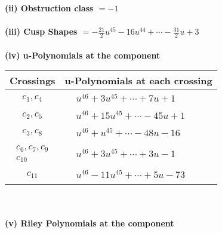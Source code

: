 \documentclass[1p]{elsarticle_modified}
\theoremstyle{definition}
\begin{document}
\flushleft \textbf{(ii) Obstruction class $= -1$}\\~\\
\flushleft \textbf{(iii) Cusp Shapes $= -\frac{21}{2} u^{45}-16 u^{44}+\cdots-\frac{31}{2} u+3$}\\~\\
\newpage\renewcommand{\arraystretch}{1}
\flushleft \textbf{(iv) u-Polynomials at the component}\newline \\
\begin{tabular}{m{50pt}|m{274pt}}
Crossings & \hspace{64pt}u-Polynomials at each crossing \\
\hline $$\begin{aligned}c_{1},c_{4}\end{aligned}$$&$\begin{aligned}
&u^{46}+3 u^{45}+\cdots+7 u+1
\end{aligned}$\\
\hline $$\begin{aligned}c_{2},c_{5}\end{aligned}$$&$\begin{aligned}
&u^{46}+15 u^{45}+\cdots-45 u+1
\end{aligned}$\\
\hline $$\begin{aligned}c_{3},c_{8}\end{aligned}$$&$\begin{aligned}
&u^{46}+u^{45}+\cdots-48 u-16
\end{aligned}$\\
\hline $$\begin{aligned}c_{6},c_{7},c_{9}\\c_{10}\end{aligned}$$&$\begin{aligned}
&u^{46}+3 u^{45}+\cdots+3 u-1
\end{aligned}$\\
\hline $$\begin{aligned}c_{11}\end{aligned}$$&$\begin{aligned}
&u^{46}-11 u^{45}+\cdots+5 u-73
\end{aligned}$\\
\hline
\end{tabular}\\~\\
\newpage\renewcommand{\arraystretch}{1}
\flushleft \textbf{(v) Riley Polynomials at the component}\newline \\
\end{document}

